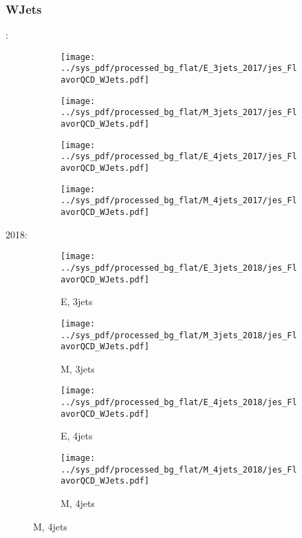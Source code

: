 \documentclass{beamer}
\begin{document}
\begin{frame}
\frametitle{WJets}
\fontsize{5}{1}:
\begin{figure}
\centering
\begin{subfigure}[b]{0.24\textwidth}
\texttt{[image: ../sys\_pdf/processed\_bg\_flat/E\_3jets\_2017/jes\_FlavorQCD\_WJets.pdf]}
\end{subfigure}
\begin{subfigure}[b]{0.24\textwidth}
\texttt{[image: ../sys\_pdf/processed\_bg\_flat/M\_3jets\_2017/jes\_FlavorQCD\_WJets.pdf]}
\end{subfigure}
\begin{subfigure}[b]{0.24\textwidth}
\texttt{[image: ../sys\_pdf/processed\_bg\_flat/E\_4jets\_2017/jes\_FlavorQCD\_WJets.pdf]}
\end{subfigure}
\begin{subfigure}[b]{0.24\textwidth}
\texttt{[image: ../sys\_pdf/processed\_bg\_flat/M\_4jets\_2017/jes\_FlavorQCD\_WJets.pdf]}
\end{subfigure}
\end{figure}
2018:
\begin{figure}
\centering
\begin{subfigure}[b]{0.24\textwidth}
\texttt{[image: ../sys\_pdf/processed\_bg\_flat/E\_3jets\_2018/jes\_FlavorQCD\_WJets.pdf]}
\captionsetup{font=tiny}
\caption{E, 3jets}
\end{subfigure}
\begin{subfigure}[b]{0.24\textwidth}
\texttt{[image: ../sys\_pdf/processed\_bg\_flat/M\_3jets\_2018/jes\_FlavorQCD\_WJets.pdf]}
\captionsetup{font=tiny}
\caption{M, 3jets}
\end{subfigure}
\begin{subfigure}[b]{0.24\textwidth}
\texttt{[image: ../sys\_pdf/processed\_bg\_flat/E\_4jets\_2018/jes\_FlavorQCD\_WJets.pdf]}
\captionsetup{font=tiny}
\caption{E, 4jets}
\end{subfigure}
\begin{subfigure}[b]{0.24\textwidth}
\texttt{[image: ../sys\_pdf/processed\_bg\_flat/M\_4jets\_2018/jes\_FlavorQCD\_WJets.pdf]}
\captionsetup{font=tiny}
\caption{M, 4jets}
\end{subfigure}
\end{figure}
\end{frame}
\end{document}
